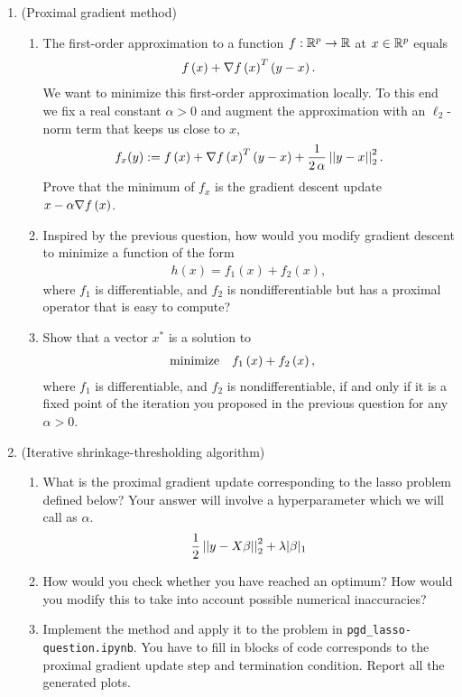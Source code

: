 \documentclass[12pt,twoside]{article}
\begin{document}
\begin{enumerate}
 \newpage
  \item (Proximal gradient method)   
 \begin{enumerate}
 \item The first-order approximation to a function $f:\mathbb{R}^{p}\rightarrow \mathbb{R}$ at $x \in \mathbb{R}^{p}$ equals
 \begin{align}
f\left( x \right) + \nabla f\left( x \right)^T\left( y-x \right). 
\end{align}
We want to minimize this first-order approximation locally. To this end we fix a real constant $\alpha >0$ and augment the approximation with an $\ell_2$-norm term that keeps us close to $x$,
 \begin{align}
f_{x}(y) :=f\left( x \right) + \nabla f\left( x \right)^T\left( y-x \right) +  \frac{1}{2 \, \alpha }\left|\left| y-x \right|\right| _{2}^2.
\end{align}
 Prove that the minimum of $f_{x}$ is the gradient descent update $x- \alpha \nabla f\left( x \right)$.
\item 
Inspired by the previous question, how would you modify gradient descent to minimize a function of the form
\begin{align}
h(x) = f_1(x) + f_2(x),
\end{align}
where $f_1$ is differentiable, and $f_2$ is nondifferentiable but has a proximal operator that is easy to compute?
\item Show that a vector $x^{\ast}$ is a solution to
\begin{align}
 \operatorname{minimize} \quad & f_1\left( x \right) + f_2\left( x \right),
\end{align}
where $f_1$ is differentiable, and $f_2$ is nondifferentiable, if and only if it is a fixed point of the iteration you proposed in the previous question for any $\alpha > 0$.
  \end{enumerate}
  
  \item (Iterative shrinkage-thresholding algorithm)   
 \begin{enumerate}
 \item What is the proximal gradient update corresponding to the lasso problem defined below? Your answer will involve a hyperparameter which we will call as $\alpha$. 
 \begin{align*}
 \frac{1}{2} \left|\left| y - X\beta \right|\right| _{2}^2 + \lambda |\beta|_1
 \end{align*}
 \item How would you check whether you have reached an optimum? How would you modify this to take into account possible numerical inaccuracies?
 \item Implement the method and apply it to the problem in \texttt{pgd\_lasso-question.ipynb}. You have to fill in blocks of code corresponds to the proximal gradient update step and termination condition. Report all the generated plots.
 \end{enumerate}
 

 \end{enumerate}
\end{document}
